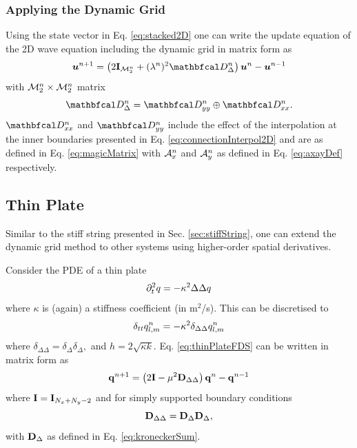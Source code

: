\documentclass[fleqn]{jaes}
\begin{document}
\subsubsection{Applying the Dynamic Grid}
Using the state vector in Eq. \eqref{eq:stacked2D} one can write the update equation of the 2D wave equation including the dynamic grid in matrix form as
\begin{equation}\label{eq:2DwaveDynMatrix}
    \uStack^{n+1} = \left(2\I_\MtwoD + (\lambda^n)^2\DDdelta\right)\uStack^n -\uStack^{n-1}
\end{equation}
with ${\mathcal{M}_2^n} \times {\mathcal{M}_2^n}$ matrix
\begin{equation}
    \DDdelta = \DDyy \oplus \DDxx.
\end{equation}
$\DDxx$ and $\DDyy$ include the effect of the interpolation at the inner boundaries presented in Eq. \eqref{eq:connectionInterpol2D} and are as defined in Eq. \eqref{eq:magicMatrix} with $\mathcal{A}^n_x$ and $\mathcal{A}^n_y$ as defined in Eq. \eqref{eq:axayDef} respectively. 

\subsection{Thin Plate}
Similar to the stiff string presented in Sec. \ref{sec:stiffString}, one can extend the dynamic grid method to other systems using higher-order spatial derivatives.

Consider the PDE of a thin plate \cite{Morse1968}
\begin{equation}\label{eq:thinPlateFDS}
    \ptt q = -\kappa^2\Delta\Delta q
\end{equation}
where $\kappa$ is (again) a stiffness coefficient (in m$^2$/s). This can be discretised to 
\begin{equation}
    \delta_{tt}q_{l,m}^n = -\kappa^2\delta_{\Delta\Delta}q_{l,m}^n
\end{equation}
where $\delta_{\Delta\Delta} = \delta_{\Delta}\delta_{\Delta},$ and $ h = 2\sqrt{\kappa k}$. 
Eq. \eqref{eq:thinPlateFDS} can be written in matrix form as
\begin{equation}
    \mathbf{q}^{n+1} = \left(2\mathbf{I} - \mu^2 \mathbf{D}_{\Delta\Delta}\right)\mathbf{q}^n - \mathbf{q}^{n-1}
\end{equation}
where $\mathbf{I} = \mathbf{I}_{N_x + N_y - 2}$ and for simply supported boundary conditions
\begin{equation}
    \mathbf{D}_{\Delta\Delta} = \mathbf{D}_\Delta\mathbf{D}_\Delta,
\end{equation}
with $\mathbf{D}_\Delta$ as defined in Eq. \eqref{eq:kroneckerSum}.
\end{document}
